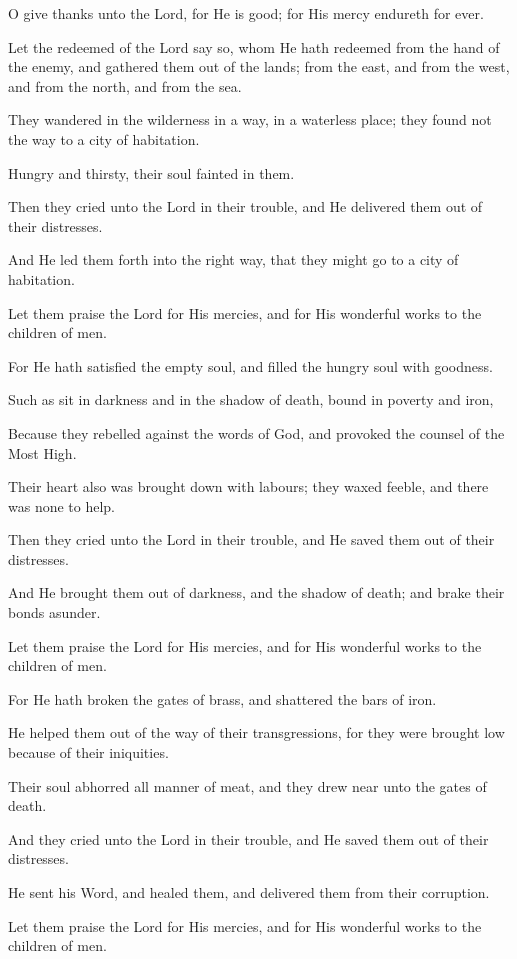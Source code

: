 O give thanks unto the Lord, for He is good; for His mercy endureth for ever.

Let the redeemed of the Lord say so, whom He hath redeemed from the hand of the enemy, and gathered them out of the lands; from the east, and from the west, and from the north, and from the sea.

They wandered in the wilderness in a way, in a waterless place; they found not the way to a city of habitation.

Hungry and thirsty, their soul fainted in them.

Then they cried unto the Lord in their trouble, and He delivered them out of their distresses.

And He led them forth into the right way, that they might go to a city of habitation.

Let them praise the Lord for His mercies, and for His wonderful works to the children of men.

For He hath satisfied the empty soul, and filled the hungry soul with goodness.

Such as sit in darkness and in the shadow of death, bound in poverty and iron,

Because they rebelled against the words of God, and provoked the counsel of the Most High.

Their heart also was brought down with labours; they waxed feeble, and there was none to help.

Then they cried unto the Lord in their trouble, and He saved them out of their distresses.

And He brought them out of darkness, and the shadow of death; and brake their bonds asunder.

Let them praise the Lord for His mercies, and for His wonderful works to the children of men.

For He hath broken the gates of brass, and shattered the bars of iron.

He helped them out of the way of their transgressions, for they were brought low because of their iniquities.

Their soul abhorred all manner of meat, and they drew near unto the gates of death.

And they cried unto the Lord in their trouble, and He saved them out of their distresses.

He sent his Word, and healed them, and delivered them from their corruption.

Let them praise the Lord for His mercies, and for His wonderful works to the children of men.

